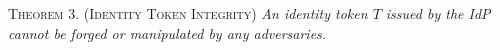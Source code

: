 
\newc
\vspace{1mm}
\noindent\textsc{Theorem 3. (Identity Token Integrity)} {\em An identity token $T$ issued by the IdP cannot be forged or manipulated by any adversaries.}



